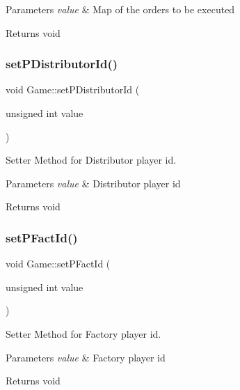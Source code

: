 \begin{DoxyParams}{Parameters}
{\em value} & Map of the orders to be executed \\
\hline
\end{DoxyParams}
\begin{DoxyReturn}{Returns}
void 
\end{DoxyReturn}
\mbox{\label{classGame_ab88440f7297899b9e534f314f5f49eaa}} 
\subsubsection{\texorpdfstring{set\+P\+Distributor\+Id()}{setPDistributorId()}}
{\footnotesize\ttfamily void Game\+::set\+P\+Distributor\+Id (\begin{DoxyParamCaption}\item[{unsigned int}]{value }\end{DoxyParamCaption})}



Setter Method for Distributor player id. 


\begin{DoxyParams}{Parameters}
{\em value} & Distributor player id \\
\hline
\end{DoxyParams}
\begin{DoxyReturn}{Returns}
void 
\end{DoxyReturn}
\mbox{\label{classGame_a144ffe419003a0cb19001c46109a6bfe}} 
\subsubsection{\texorpdfstring{set\+P\+Fact\+Id()}{setPFactId()}}
{\footnotesize\ttfamily void Game\+::set\+P\+Fact\+Id (\begin{DoxyParamCaption}\item[{unsigned int}]{value }\end{DoxyParamCaption})}



Setter Method for Factory player id. 


\begin{DoxyParams}{Parameters}
{\em value} & Factory player id \\
\hline
\end{DoxyParams}
\begin{DoxyReturn}{Returns}
void 
\end{DoxyReturn}
\mbox{\label{classGame_ae192d77627e937d9840f77126fc0b3b7}} 
